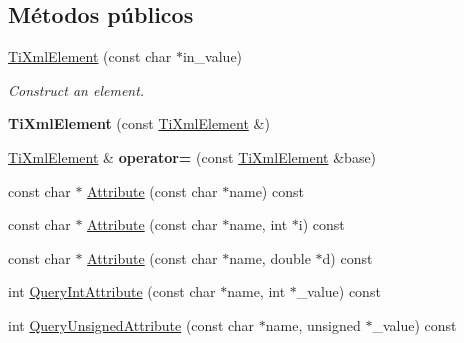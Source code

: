 \subsection*{\-Métodos públicos}
\begin{DoxyCompactItemize}
\item 
\hypertarget{classTiXmlElement_a01bc3ab372d35da08efcbbe65ad90c60}{\hyperlink{classTiXmlElement_a01bc3ab372d35da08efcbbe65ad90c60}{\-Ti\-Xml\-Element} (const char $\ast$in\-\_\-value)}\label{classTiXmlElement_a01bc3ab372d35da08efcbbe65ad90c60}

\begin{DoxyCompactList}\small\item\em \-Construct an element. \end{DoxyCompactList}\item 
\hypertarget{classTiXmlElement_a1ca4465f3c2eac6a60e641cd7f1d9f7e}{{\bfseries \-Ti\-Xml\-Element} (const \hyperlink{classTiXmlElement}{\-Ti\-Xml\-Element} \&)}\label{classTiXmlElement_a1ca4465f3c2eac6a60e641cd7f1d9f7e}

\item 
\hypertarget{classTiXmlElement_ad58d300f4cfc0016ffa6861ebb718a0b}{\hyperlink{classTiXmlElement}{\-Ti\-Xml\-Element} \& {\bfseries operator=} (const \hyperlink{classTiXmlElement}{\-Ti\-Xml\-Element} \&base)}\label{classTiXmlElement_ad58d300f4cfc0016ffa6861ebb718a0b}

\item 
const char $\ast$ \hyperlink{classTiXmlElement_ac1e4691e9375ba4e665dce7e46a50a9c}{\-Attribute} (const char $\ast$name) const 
\item 
const char $\ast$ \hyperlink{classTiXmlElement_aa9192e80567b5042dbded80b78c44339}{\-Attribute} (const char $\ast$name, int $\ast$i) const 
\item 
const char $\ast$ \hyperlink{classTiXmlElement_aec4f727f8aa49b51248d80125d173136}{\-Attribute} (const char $\ast$name, double $\ast$d) const 
\item 
int \hyperlink{classTiXmlElement_aea0bfe471380f281c5945770ddbf52b9}{\-Query\-Int\-Attribute} (const char $\ast$name, int $\ast$\-\_\-value) const 
\item 
\hypertarget{classTiXmlElement_ae48df644f890ab86fa19839ac401f00d}{int \hyperlink{classTiXmlElement_ae48df644f890ab86fa19839ac401f00d}{\-Query\-Unsigned\-Attribute} (const char $\ast$name, unsigned $\ast$\-\_\-value) const }\label{classTiXmlElement_ae48df644f890ab86fa19839ac401f00d}


\end{DoxyCompactItemize}

